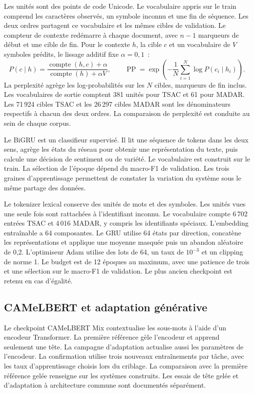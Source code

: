 Les unités sont des points de code Unicode. Le vocabulaire appris sur le train comprend les caractères observés, un symbole inconnu et une fin de séquence. Les deux ordres partagent ce vocabulaire et les mêmes cibles de validation. Le compteur de contexte redémarre à chaque document, avec $n-1$ marqueurs de début et une cible de fin. Pour le contexte $h$, la cible $c$ et un vocabulaire de $V$ symboles prédits, le lissage additif fixe $\alpha=0{,}1$~:
\[
P(c\mid h)=\frac{\operatorname{compte}(h,c)+\alpha}{\operatorname{compte}(h)+\alpha V},\qquad
\operatorname{PP}=\exp\!\left(-\frac{1}{N}\sum_{i=1}^{N}\log P(c_i\mid h_i)\right).
\]
La perplexité agrège les log-probabilités sur les $N$ cibles, marqueurs de fin inclus. Les vocabulaires de sortie comptent 381 unités pour TSAC et 61 pour MADAR. Les 71\,924 cibles TSAC et les 26\,297 cibles MADAR sont les dénominateurs respectifs à chacun des deux ordres. La comparaison de perplexité est conduite au sein de chaque corpus.

Le BiGRU est un classifieur supervisé. Il lit une séquence de tokens dans les deux sens, agrège les états du réseau pour obtenir une représentation du texte, puis calcule une décision de sentiment ou de variété. Le vocabulaire est construit sur le train. La sélection de l’époque dépend du macro-F1 de validation. Les trois graines d’apprentissage permettent de constater la variation du système sous le même partage des données.

Le tokenizer lexical conserve des unités de mots et des symboles. Les unités vues une seule fois sont rattachées à l’identifiant inconnu. Le vocabulaire compte 6\,702 entrées TSAC et 4\,016 MADAR, y compris les identifiants spéciaux. L’embedding entraînable a 64 composantes. Le GRU utilise 64 états par direction, concatène les représentations et applique une moyenne masquée puis un abandon aléatoire de 0,2. L’optimiseur Adam utilise des lots de 64, un taux de $10^{-3}$ et un clipping de norme 1. Le budget est de 12 époques au maximum, avec une patience de trois et une sélection sur le macro-F1 de validation. Le plus ancien checkpoint est retenu en cas d’égalité.

\subsection{CAMeLBERT et adaptation générative}
Le checkpoint CAMeLBERT Mix contextualise les sous-mots à l’aide d’un encodeur Transformer. La première référence gèle l’encodeur et apprend seulement une tête. La campagne d’adaptation actualise aussi les paramètres de l’encodeur. La confirmation utilise trois nouveaux entraînements par tâche, avec les taux d’apprentissage choisis lors du criblage. La comparaison avec la première référence gelée renseigne sur les systèmes construits. Les essais de tête gelée et d’adaptation à architecture commune sont documentés séparément.

